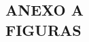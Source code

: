 \clearpage
\vspace*{\fill}
\begin{center}
    \section*{ANEXO A \\ FIGURAS}
\end{center}
\vspace*{\fill}
\clearpage
\newpage



\newpage

\newpage


